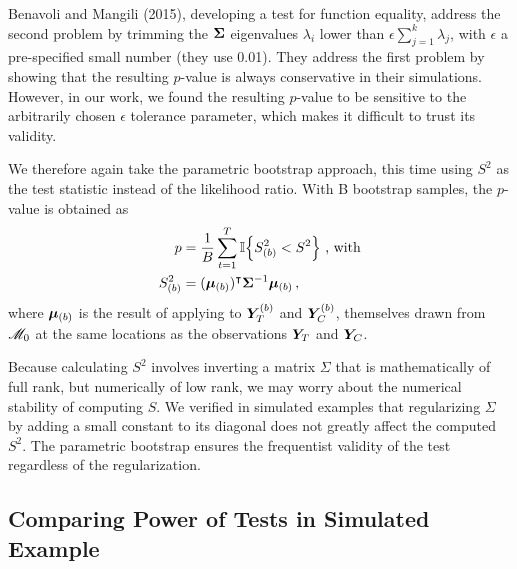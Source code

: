 	Benavoli and Mangili (2015), developing a test for function equality, address the second problem by trimming the \(\bm{\Sigma}\) eigenvalues \(\lambda_i\) lower than \(\epsilon \sum_{j=1}^k \lambda_j\), with \(\epsilon\) a pre-specified small number (they use 0.01).
They address the first problem by showing that the resulting \(p\)-value is always conservative in their simulations.
However, in our work, we found the resulting \(p\)-value to be sensitive to the arbitrarily chosen \(\epsilon\) tolerance parameter, which makes it difficult to trust its validity.

	We therefore again take the parametric bootstrap approach, this time using \(S^2\) as the test statistic instead of the likelihood ratio.
With B bootstrap samples, the \(p\)-value is obtained as
\begin{equation}
    \begin{split}
        p &= \frac{1}{B} \sum_{t=1}^T \Ind\cbr{S_{(b)}^2 < S^2}\  \text{, with}\\
        S_{(b)}^2 &= (\muvec_{(b)} )\trans \SigmaMat^{-1} \muvec_{(b)}\,,
    \end{split}
\end{equation}
where \(\bm{\mu}_{(b)}\) is the result of applying  to \(\bm{Y}_{T}^{(b)}\) and \(\bm{Y}_{C}^{(b)}\), themselves drawn from \(\mathscr{M}_0\) at the same locations as the observations \(\bm{Y}_{T}\) and \(\bm{Y}_{C}\).

	Because calculating \(S^2\) involves inverting a matrix \(\Sigma\) that is mathematically of full rank, but numerically of low rank, we may worry about the numerical stability of computing \(S\).
We verified in simulated examples that regularizing \(\Sigma\) by adding a small constant to its diagonal does not greatly affect the computed \(S^2\).
The parametric bootstrap ensures the frequentist validity of the test
regardless of the regularization.


\subsection{Comparing Power of Tests in Simulated Example}
\label{sec:powersim}

